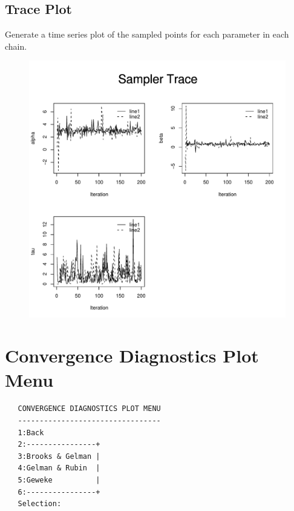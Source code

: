 \documentclass[12pt,letterpaper]{report}
\begin{document}
\pagebreak

\subsection{Trace Plot}
\noindent
Generate a time series plot of the sampled points for each parameter in each
chain.

\begin{figure}[h]
\centering
\includegraphics[keepaspectratio,width=5in]{trace.pdf}
\end{figure}

\pagebreak

\section{Convergence Diagnostics Plot Menu}
\noindent

\vskip 9pt
\begin{tiny}
\begin{verbatim}
   CONVERGENCE DIAGNOSTICS PLOT MENU
   ---------------------------------
   1:Back
   2:----------------+
   3:Brooks & Gelman |
   4:Gelman & Rubin  |
   5:Geweke          |
   6:----------------+
   Selection:
\end{verbatim}
\end{tiny}

\pagebreak
\end{document}
